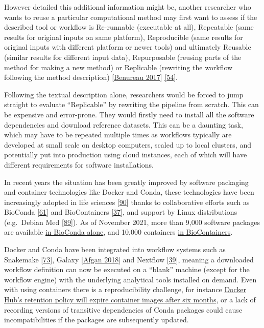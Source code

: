 However detailed this additional information might be, another
researcher who wants to reuse a particular computational method may
first want to assess if the described tool or workflow is Re-runnable
(executable at all), Repeatable (same results for original inputs on
same platform), Reproducible (same results for original inputs with
different platform or newer tools) and ultimately Reusable (similar
results for different input data), Repurposable (reusing parts of the
method for making a new method) or Replicable (rewriting the workflow
following the method description)
{[}\href{https://doi.org/10.3389/fninf.2017.00069}{Benureau 2017}{]}
\href{http://repscience2016.research-infrastructures.eu/img/CaroleGoble-ReproScience2016v2.pdf}{{[}54{]}}.

Following the textual description alone, researchers would be forced to
jump straight to evaluate ``Replicable'' by rewriting the pipeline from
scratch. This can be expensive and error-prone. They would firstly need
to install all the software dependencies and download reference
datasets. This can be a daunting task, which may have to be repeated
multiple times as workflows typically are developed at small scale on
desktop computers, scaled up to local clusters, and potentially put into
production using cloud instances, each of which will have different
requirements for software installations.

In recent years the situation has been greatly improved by software
packaging and container technologies like Docker and Conda, these
technologies have been increasingly adopted in life sciences
{[}\href{https://doi.org/10.1007/s41019-017-0050-4}{90}{]} thanks to
collaborative efforts such as BioConda
{[}\href{https://doi.org/10.1038/s41592-018-0046-7}{61}{]} and
BioContainers
{[}\href{https://doi.org/10.1093/bioinformatics/btx192}{37}{]}, and
support by Linux distributions (e.g.~Debian Med
{[}\href{https://doi.org/10.1186/1471-2105-11-S12-S5}{89}{]}). As of
November 2021, more than 9,000 software packages are available
\href{https://anaconda.org/bioconda/}{in BioConda alone}, and 10,000
containers \href{https://biocontainers.pro/\#/registry}{in
BioContainers}.

Docker and Conda have been integrated into workflow systems such as
Snakemake
{[}\href{https://doi.org/10.1093/bioinformatics/bts480}{73}{]}, Galaxy
{[}\href{https://doi.org/10.1093/nar/gky379}{Afgan 2018}{]} and Nextflow
{[}\href{https://doi.org/10.1038/nbt.3820}{39}{]}, meaning a downloaded
workflow definition can now be executed on a ``blank'' machine (except
for the workflow engine) with the underlying analytical tools installed
on demand. Even with using containers there is a reproducibility
challenge, for instance
\href{https://www.docker.com/blog/docker-hub-image-retention-policy-delayed-and-subscription-updates/}{Docker
Hub's retention policy will expire container images after six months},
or a lack of recording versions of transitive dependencies of Conda
packages could cause incompatibilities if the packages are subsequently
updated.


